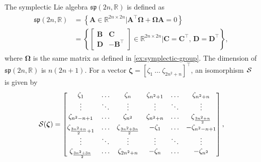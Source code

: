 \begin{example}
    The symplectic Lie algebra $\mathfrak{sp}(2n, \mathbb{R})$ is defined as
    \begin{align*}
        \begin{split}
            \mathfrak{sp}(2n, \mathbb{R}) &= \left\{ \mathbf{A} \in \mathbb{R}^{2n\times 2n} | \mathbf{A}^\top\boldsymbol{\Omega} + \boldsymbol{\Omega}\mathbf{A} = 0 \right\} \\&= \left\{ \begin{bmatrix} \mathbf{B} & \mathbf{C} \\ \mathbf{D} & -\mathbf{B}^\top \end{bmatrix}\in \mathbb{R}^{2n\times 2n}| \mathbf{C} = \mathbf{C}^\top,\, \mathbf{D} = \mathbf{D}^\top\right\},            
        \end{split}
    \end{align*}
    where $\boldsymbol{\Omega}$ is the same matrix as defined in \autoref{ex:symplectic-group}. The dimension of $\mathfrak{sp}(2n, \mathbb{R})$ is $n(2n + 1)$. For a vector $\boldsymbol{\zeta} = [\zeta_1\ \dots\ \zeta_{2n^2+n}]^\top$, an isomorphism $\SL$ is given by
    \begin{align*}
        \SL[\boldsymbol{\zeta}] = \begin{bmatrix}
            \zeta_1 & \dots & \zeta_n & \zeta_{n^2 + 1} & \dots & \zeta_{n^2 + n} \\
            \vdots & \ddots & \vdots & \vdots & \ddots & \vdots \\
            \zeta_{n^2 - n + 1} & \dots & \zeta_{n^2} & \zeta_{n^2 + n} & \dots & \zeta_{\frac{3n^2+n}{2}}\\
            \zeta_{\frac{3n^2+n}{2} + 1} & \dots & \zeta_{\frac{3n^2+3n}{2}} & -\zeta_1 & \dots & -\zeta_{n^2 - n + 1}\\
            \vdots & \ddots & \vdots & \vdots & \ddots & \vdots\\
            \zeta_{\frac{3n^2+3n}{2}} & \dots & \zeta_{2n^2 + n}& -\zeta_n & \dots & -\zeta_{n^2} 
        \end{bmatrix},
    \end{align*}
\end{example}
